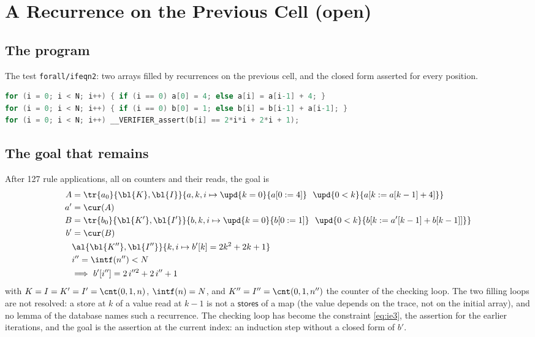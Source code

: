 \section{A Recurrence on the Previous Cell (open)}\label{sec:ifeqn2}

\subsection{The program}
The test \texttt{forall/ifeqn2}: two arrays filled by recurrences on the previous cell, and the closed form
asserted for every position.
\begin{lstlisting}[language=C]
for (i = 0; i < N; i++) { if (i == 0) a[0] = 4; else a[i] = a[i-1] + 4; }
for (i = 0; i < N; i++) { if (i == 0) b[0] = 1; else b[i] = b[i-1] + a[i-1]; }
for (i = 0; i < N; i++) __VERIFIER_assert(b[i] == 2*i*i + 2*i + 1);
\end{lstlisting}

\subsection{The goal that remains}
After 127 rule applications, all on counters and their reads, the goal is
\begin{align}
  A &= \tr{a_0}{\bl{K}, \bl{I}}{a, k, i \mapsto \upd{k = 0}{a[0 := 4]}\ \ \upd{0 < k}{a[k := a[k - 1] + 4]}} \label{eq:ie1}\\
  a' &= \cur(A) \nonumber\\
  B &= \tr{b_0}{\bl{K'}, \bl{I'}}{b, k, i \mapsto \upd{k = 0}{b[0 := 1]}\ \ \upd{0 < k}{b[k := a'[k - 1] + b[k - 1]]}} \label{eq:ie2}\\
  b' &= \cur(B) \nonumber\\
  &\al{\bl{K''}, \bl{I''}}{k, i \mapsto b'[k] = 2k^2 + 2k + 1} \label{eq:ie3}\\
  &i'' = \intf(n'') < N \nonumber\\
  &\Longrightarrow\ b'[i''] = 2\,i''^2 + 2\,i'' + 1 \nonumber
\end{align}
with $K = I = K' = I' = \cnt(0, 1, n)$, $\intf(n) = N$, and $K'' = I'' = \cnt(0, 1, n'')$ the counter of the
checking loop. The two filling loops are not resolved: a store at $k$ of a value read at $k - 1$ is not a
$\mathsf{stores}$ of a map (the value depends on the trace, not on the initial array), and no lemma of the
database names such a recurrence. The checking loop has become the constraint \eqref{eq:ie3}, the assertion
for the earlier iterations, and the goal is the assertion at the current index: an induction step without a
closed form of $b'$.

